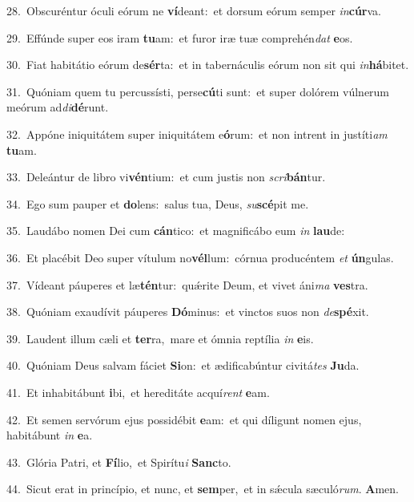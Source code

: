{\numbfont\textcolor{\numbcolor}{28.}}~Obscuréntur óculi eórum ne \textbf{ví}\-deant:~\star et dorsum eórum semper \textit{in}\-\textbf{cúr}va.\par
{\numbfont\textcolor{\numbcolor}{29.}}~Effúnde super eos iram \textbf{tu}\-am:~\star et furor iræ tuæ comprehén\textit{dat} \textbf{e}\-os.\par
{\numbfont\textcolor{\numbcolor}{30.}}~Fiat habitátio eórum de\-\textbf{sér}\-ta:~\star et in tabernáculis eórum non sit qui \textit{in}\-\textbf{há}bitet.\par
{\numbfont\textcolor{\numbcolor}{31.}}~Quóniam quem tu percussísti, perse\-\textbf{cú}\-ti sunt:~\star et super dolórem vúlnerum meórum ad\-\textit{di}\-\textbf{dé}runt.\par
{\numbfont\textcolor{\numbcolor}{32.}}~Appóne iniquitátem super iniquitátem e\-\textbf{ó}\-rum:~\star et non intrent in justíti\textit{am} \textbf{tu}\-am.\par
{\numbfont\textcolor{\numbcolor}{33.}}~Deleántur de libro vi\-\textbf{vén}\-tium:~\star et cum justis non \textit{scri}\-\textbf{bán}tur.\par
{\numbfont\textcolor{\numbcolor}{34.}}~Ego sum pauper et \textbf{do}\-lens:~\star salus tua, Deus, \textit{su}\-\textbf{scé}pit me.\par
{\numbfont\textcolor{\numbcolor}{35.}}~Laudábo nomen Dei cum \textbf{cán}\-tico:~\star et magnificábo eum \textit{in} \textbf{lau}\-de:\par
{\numbfont\textcolor{\numbcolor}{36.}}~Et placébit Deo super vítulum no\-\textbf{vél}\-lum:~\star córnua producéntem \textit{et} \textbf{ún}\-gulas.\par
{\numbfont\textcolor{\numbcolor}{37.}}~Vídeant páuperes et læ\-\textbf{tén}\-tur:~\star quǽrite Deum, et vivet áni\textit{ma} \textbf{ves}\-tra.\par
{\numbfont\textcolor{\numbcolor}{38.}}~Quóniam exaudívit páuperes \textbf{Dó}\-minus:~\star et vinctos suos non \textit{de}\-\textbf{spé}xit.\par
{\numbfont\textcolor{\numbcolor}{39.}}~Laudent illum cæli et \textbf{ter}\-ra,~\star mare et ómnia reptília \textit{in} \textbf{e}\-is.\par
{\numbfont\textcolor{\numbcolor}{40.}}~Quóniam Deus salvam fáciet \textbf{Si}\-on:~\star et ædificabúntur civitá\textit{tes} \textbf{Ju}\-da.\par
{\numbfont\textcolor{\numbcolor}{41.}}~Et inhabitábunt \textbf{i}\-bi,~\star et hereditáte acquí\textit{rent} \textbf{e}\-am.\par
{\numbfont\textcolor{\numbcolor}{42.}}~Et semen servórum ejus possidébit \textbf{e}\-am:~\star et qui díligunt nomen ejus, habitábunt \textit{in} \textbf{e}\-a.\par
{\numbfont\textcolor{\numbcolor}{43.}}~Glória Patri, et \textbf{Fí}\-lio,~\star et Spirítu\textit{i} \textbf{Sanc}\-to.\par
{\numbfont\textcolor{\numbcolor}{44.}}~Sicut erat in princípio, et nunc, et \textbf{sem}\-per,~\star et in sǽcula sæculó\-\textit{rum}\-. \textbf{A}\-men.\par
